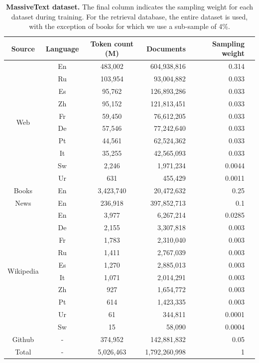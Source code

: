 \documentclass[11pt, a4paper, logo]{deepmind}
\begin{document}
\begin{table}[h]
\small 
\begin{center}
\begin{tabular}{c c c r r r}
Source & Language & Token count (M) & Documents  & Sampling weight\\ [0.5ex] 
\toprule
\multirow{ 10}{*}{Web} & En &  483,002 &  604,938,816 & 0.314 \\ 
 & Ru &  103,954 &  93,004,882 & 0.033 \\ 
 & Es &  95,762 &  126,893,286 & 0.033 \\ 
 & Zh &  95,152 &  121,813,451 & 0.033 \\ 
 & Fr &  59,450 &  76,612,205 & 0.033 \\ 
 & De &  57,546 &  77,242,640 & 0.033 \\ 
 & Pt &  44,561 &  62,524,362 & 0.033 \\ 
 & It &  35,255 &  42,565,093 & 0.033 \\ 
 & Sw &  2,246 &  1,971,234 & 0.0044 \\ 
 & Ur &  631 &  455,429 & 0.0011 \\ 
\midrule
Books & En &  3,423,740 & 20,472,632  & 0.25 \\
\midrule
News & En & 236,918 & 397,852,713 & 0.1 \\
\midrule
\multirow{10}{*}{Wikipedia}  & En &  3,977 &  6,267,214 & 0.0285 \\ 
 & De &  2,155 &  3,307,818 & 0.003 \\ 
 & Fr &  1,783 &  2,310,040 & 0.003 \\ 
 & Ru &  1,411 &  2,767,039 & 0.003 \\ 
 & Es &  1,270 &  2,885,013 & 0.003 \\ 
 & It &  1,071 &  2,014,291 & 0.003 \\ 
 & Zh &  927 &  1,654,772 & 0.003 \\ 
 & Pt &  614 &  1,423,335 & 0.003 \\ 
 & Ur &  61 &  344,811 & 0.0001 \\ 
 & Sw &  15 &  58,090 & 0.0004 \\ 
\midrule
Github & - &374,952 & 142,881,832  & 0.05 \\
\midrule
Total & - & 5,026,463 & 1,792,260,998 & 1
\end{tabular}
\caption{\textbf{MassiveText dataset.} The final column indicates the sampling weight for each dataset during training. For the retrieval database, the entire dataset is used, with the exception of books for which we use a sub-sample of 4\%.}
\label{tab:massive-text-full}

\end{center}
\end{table}
\end{document}

